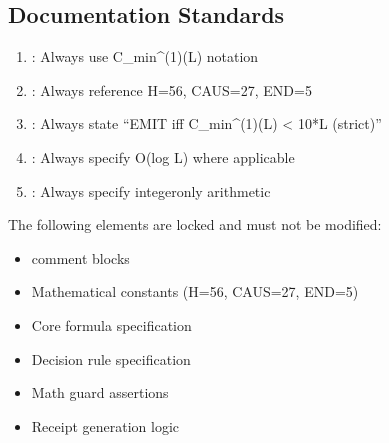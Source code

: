 \documentclass[letterpaper,10pt,english]{sphinxmanual}
\begin{document}
\subsection{Documentation Standards}
\label{\detokenize{docstring_guide:documentation-standards}}
\sphinxAtStartPar
{}
\begin{enumerate}
%
\item {} 
\sphinxAtStartPar
{}: Always use C\_min\textasciicircum{}(1)(L) notation

\item {} 
\sphinxAtStartPar
{}: Always reference H=56, CAUS=27, END=5

\item {} 
\sphinxAtStartPar
{}: Always state “EMIT iff C\_min\textasciicircum{}(1)(L) \textless{} 10*L (strict)”

\item {} 
\sphinxAtStartPar
{}: Always specify O(log L) where applicable

\item {} 
\sphinxAtStartPar
{}: Always specify integer\sphinxhyphen{}only arithmetic

\end{enumerate}

\sphinxAtStartPar
{}

\sphinxAtStartPar
The following elements are locked and must not be modified:
\begin{itemize}
\item {} 
\sphinxAtStartPar
{} comment blocks

\item {} 
\sphinxAtStartPar
Mathematical constants (H=56, CAUS=27, END=5)

\item {} 
\sphinxAtStartPar
Core formula specification

\item {} 
\sphinxAtStartPar
Decision rule specification

\item {} 
\sphinxAtStartPar
Math guard assertions

\item {} 
\sphinxAtStartPar
Receipt generation logic

\end{itemize}
\end{document}
